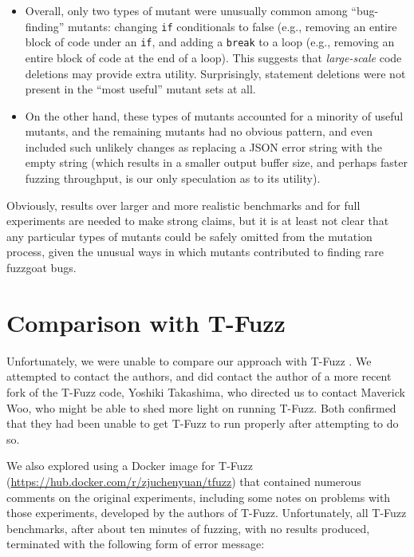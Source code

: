 \begin{itemize}
\item Overall, only two types of mutant were unusually common among ``bug-finding'' mutants: changing {\tt if} conditionals to false (e.g., removing an entire block of code under an {\tt if}, and adding a {\tt break} to a loop (e.g., removing an entire block of code at the end of a loop).  This suggests that \emph{large-scale} code deletions may provide extra utility.  Surprisingly, statement deletions were not present in the ``most useful'' mutant sets at all.
\item On the other hand, these types of mutants accounted for a minority of useful mutants, and the remaining mutants had no obvious pattern, and even included such unlikely changes as replacing a JSON error string with the empty string (which results in a smaller output buffer size, and perhaps faster fuzzing throughput, is our only speculation as to its utility).
\end{itemize}

Obviously, results over larger and more realistic benchmarks and for full experiments are needed to make strong claims, but it is at least not clear that any particular types of mutants could be safely omitted from the mutation process, given the unusual ways in which mutants contributed to finding rare fuzzgoat bugs.

\section{Comparison with T-Fuzz}

\label{sec:tfuzzfail}

Unfortunately, we were unable to compare our approach with T-Fuzz \cite{tfuzz}.  We attempted to contact the authors, and did contact the author of a more recent fork of the T-Fuzz code, Yoshiki Takashima, who directed us to contact Maverick Woo, who might be able to shed more light on running T-Fuzz.  Both confirmed that they had been unable to get T-Fuzz to run properly after attempting to do so.

We also explored using a Docker image for T-Fuzz (\url{https://hub.docker.com/r/zjuchenyuan/tfuzz}) that contained numerous comments on the original experiments, including some notes on problems with those experiments, developed by the authors of T-Fuzz.  Unfortunately, all T-Fuzz benchmarks, after about ten minutes of fuzzing, with no results produced, terminated with the following form of error message:

